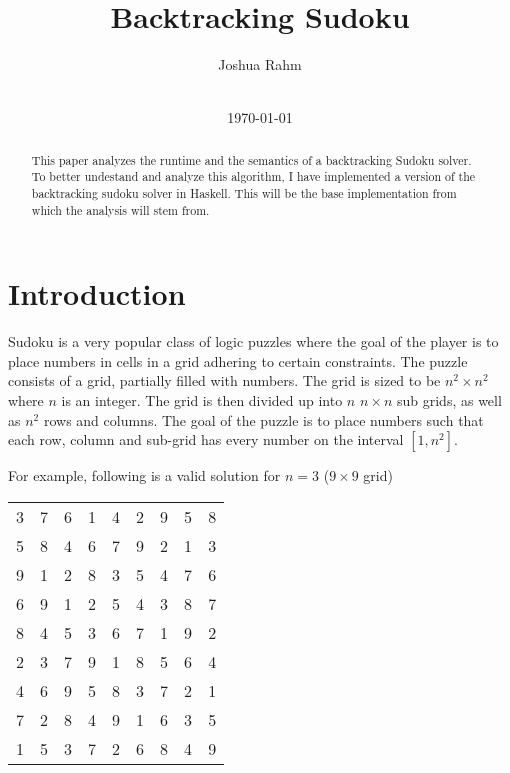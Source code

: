 \documentclass{sig-alternate-05-2015}
\begin{document}
\title{Backtracking Sudoku}
\newcommand{\sep}{\vspace{1cm}}

%
\author{
\alignauthor
Joshua Rahm\\
       \\
}
\date{\today}

\maketitle
\begin{abstract}
    This paper analyzes the runtime and the semantics of
    a backtracking Sudoku solver. To better undestand
    and analyze this algorithm, I have implemented
    a version of the backtracking sudoku solver in
    Haskell. This will be the base implementation from
    which the analysis will stem from.
\end{abstract}

\section{Introduction}

Sudoku is a very popular class of logic puzzles where the goal of the player is
to place numbers in cells in a grid adhering to certain constraints. The puzzle
consists of a grid, partially filled with numbers.  The grid is sized to be
$n^2\times n^2$ where $n$ is an integer. The grid is then divided up into $n$
$n\times n$ sub grids, as well as $n^2$ rows and columns. The goal of the
puzzle is to place numbers such that each row, column and sub-grid has every
number on the interval $[1, n^2]$.

For example, following is a valid solution for $n=3$ ($9\times 9$ grid)

\begin{center}
\sep
\def\arraystretch{1.5}
\begin{tabular}{| c c c | c c c | c c c |}
\hline
3&7&6&1&4&2&9&5&8 \\
5&8&4&6&7&9&2&1&3 \\
9&1&2&8&3&5&4&7&6 \\
\hline
6&9&1&2&5&4&3&8&7 \\
8&4&5&3&6&7&1&9&2 \\
2&3&7&9&1&8&5&6&4 \\
\hline
4&6&9&5&8&3&7&2&1 \\
7&2&8&4&9&1&6&3&5 \\
1&5&3&7&2&6&8&4&9 \\
\hline
\end{tabular}
\sep
\end{center}
\end{document}
